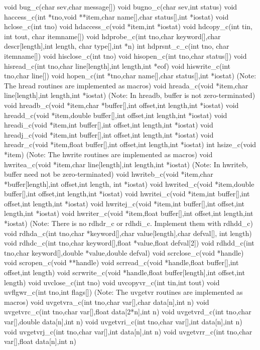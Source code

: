 {\ninepoint\begintt
void bug_c(char sev,char message[])
void bugno_c(char sev,int status)
\endtt}
{\ninepoint\begintt
void haccess_c(int *tno,void **item,char name[],char status[],int *iostat)
void hclose_c(int tno)
\endtt}
{\ninepoint\begintt
void hdaccess_c(void *item,int *iostat)
void hdcopy_c(int tin, int tout, char itemname[])
void hdprobe_c(int tno,char keyword[],char descr[length],int length,
     char type[],int *n)
int hdprsnt_c_c(int tno, char itemname[])
\endtt}
{\ninepoint\begintt
void hisclose_c(int tno)
void hisopen_c(int tno,char status[])
void hisread_c(int tno,char line[length],int length,int *eof)
void hiswrite_c(int tno,char line[])
\endtt}
{\ninepoint\begintt
void hopen_c(int *tno,char name[],char status[],int *iostat)
  (Note: The hread routines are implemented as macros)
void hreada_c(void *item,char line[length],int length,int *iostat)
  (Note: In hreadb, buffer is not zero-terminated)
void hreadb_c(void *item,char *buffer[],int offset,int length,int *iostat)
void hreadd_c(void *item,double buffer[],int offset,int length,int *iostat)
void hreadi_c(void *item,int buffer[],int offset,int length,int *iostat)
void hreadj_c(void *item,int buffer[],int offset,int length,int *iostat)
void hreadr_c(void *item,float buffer[],int offset,int length,int *iostat)
int hsize_c(void *item)
\endtt}
{\ninepoint\begintt
  (Note: The hwrite routines are implemented as macros)
void hwritea_c(void *item,char line[length],int length,int *iostat)
  (Note: In hwriteb, buffer need not be zero-terminated)
void hwriteb_c(void *item,char *buffer[length],int offset,int length,
     int *iostat)
void hwrited_c(void *item,double buffer[],int offset,int length,int *iostat)
void hwritei_c(void *item,int buffer[],int offset,int length,int *iostat)
void hwritej_c(void *item,int buffer[],int offset,int length,int *iostat)
void hwriter_c(void *item,float buffer[],int offset,int length,int *iostat)
\endtt}
{\ninepoint\begintt
  (Note: There is no rdhdr_c or rdhdi_c. Implement them with rdhdd_c)
void rdhda_c(int tno,char *keyword[],char value[length],char defval[],
     int length)
void rdhdc_c(int tno,char keyword[],float *value,float defval[2])
void rdhdd_c(int tno,char keyword[],double *value,double defval)
\endtt}
{\ninepoint\begintt
void scrclose_c(void *handle)
void scropen_c(void **handle)
void scrread_c(void *handle,float buffer[],int offset,int length)
void scrwrite_c(void *handle,float buffer[length],int offset,int length)
\endtt}
{\ninepoint\begintt
void uvclose_c(int tno)
void uvcopyvr_c(int tin,int tout)
void uvflgwr_c(int tno,int flags[])
  (Note: The uvgetvr routines are implemented as macros)
void uvgetvra_c(int tno,char var[],char data[n],int n)
void uvgetvrc_c(int tno,char var[],float data[2*n],int n)
void uvgetvrd_c(int tno,char var[],double data[n],int n)
void uvgetvri_c(int tno,char var[],int data[n],int n)
void uvgetvrj_c(int tno,char var[],int data[n],int n)
void uvgetvrr_c(int tno,char var[],float data[n],int n)
\endtt}
